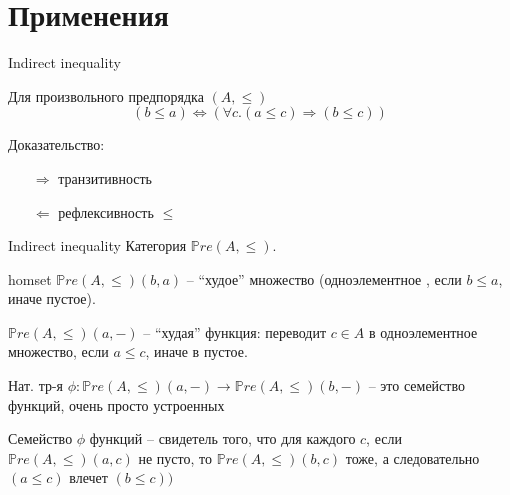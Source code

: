 \documentclass[
  russian,
  aspectratio=169,
  xcolor={svgnames},
  hyperref={colorlinks,citecolor=DeepPink4,linkcolor=DarkRed,urlcolor=DarkBlue}]{beamer}
\begin{document}
\section{Применения}

\begin{frame}[fragile]{Indirect inequality}

Для произвольного предпорядка $(A,\leqslant)$ 
$$ (b \leqslant a) \Leftrightarrow(\forall c . (a \leqslant c) \Rightarrow(b \leqslant c)) $$

Доказательство:
\begin{enumerate}
 \item[$\Rightarrow$] транзитивность
 \item[$\Leftarrow$] рефлексивность $\leqslant$
\end{enumerate}

\end{frame}

\begin{frame}[fragile]{Indirect inequality}
Категория $\mathbb{P}re(A,\leqslant)$.
\vspace{0.5cm}

homset $\mathbb{P}re(A,\leqslant)(b,a)$ -- ``худое'' множество (одноэлементное , если $b\leqslant a$, иначе пустое).\vspace{0.5cm}

$\mathbb{P}re(A,\leqslant)(a,-)$ -- ``худая'' функция: переводит $c\in A$ в одноэлементное множество, если $a\leqslant c$, иначе в пустое.\vspace{0.5cm}

Нат. тр-я $\phi: \mathbb{P}re(A, \leqslant)(a,-) \rightarrow \mathbb{P}re(A, \leqslant)(b,-)$ -- это семейство функций, очень просто устроенных\vspace{0.5cm}

Семейство $\phi$ функций -- свидетель того, что для каждого $c$, если $\mathbb{P}re(A,\leqslant)(a,c)$ не пусто, то $\mathbb{P}re(A,\leqslant)(b,c)$ тоже, а следовательно  $(a \leqslant c)$  влечет $(b\leqslant c))$
\end{frame}
\end{document}
